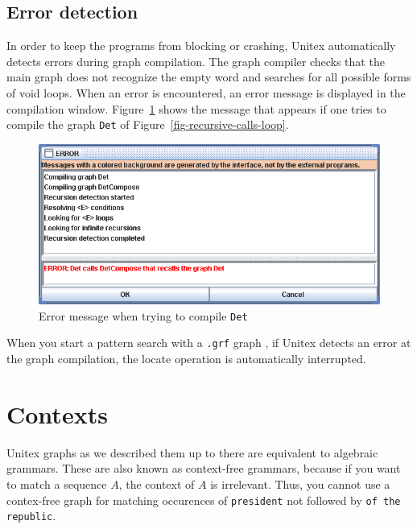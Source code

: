 \subsection{Error detection}
In order to keep the programs from blocking or crashing, Unitex automatically
detects errors during graph compilation. The graph compiler checks that the
main graph does not recognize the empty word and searches for all possible
forms of void loops. When an error is encountered, an error message is
displayed in the compilation window. Figure~\ref{fig-error-message} shows
the message that appears if one tries to compile the graph \verb+Det+ of
Figure~\ref{fig-recursive-calls-loop}.

\begin{figure}[!h]
\begin{center}
\includegraphics[width=15cm]{resources/img/fig6-11.png}
\caption{Error message when trying to compile
\texttt{Det}\label{fig-error-message}}
\end{center}
\end{figure}

\noindent When you start a pattern search with a \verb+.grf+
graph , if Unitex detects an error at the graph
compilation, the locate operation is automatically interrupted.


\section{Contexts}
\label{section-contexts}

Unitex graphs as we described them up to there are equivalent to algebraic
grammars. These are also known as context-free grammars, because if you want to
match a sequence $A$, the context of $A$ is irrelevant. Thus, you cannot use a
contex-free graph for matching occurences of \verb+president+ not followed by
\verb+of the republic+.


